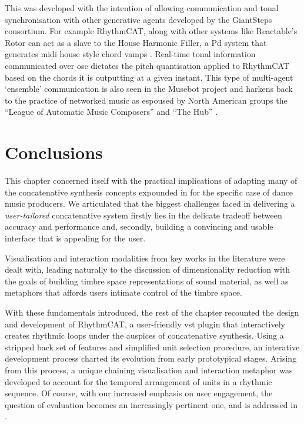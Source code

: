 \normalsize

This was developed with the intention of allowing communication and tonal synchronisation with other generative agents developed by the GiantSteps consortium. For example RhythmCAT, along with other systems like Reactable's Rotor can act as a slave to the House Harmonic Filler, a Pd system that generates \acrshort{midi} house style chord vamps \citep{Faraldo2017a}. Real-time tonal information communicated over \acrshort{osc} dictates the pitch quantisation applied to RhythmCAT based on the chords it is outputting at a given instant. This type of multi-agent `ensemble' communication is also seen in the Musebot project \citep{Bown2013, Bown2015, eigenfeldt2016musebots} and harkens back to the practice of networked music as espoused by North American groups the ``League of Automatic Music Composers'' and ``The Hub'' \citep{bischoff1978music, Gresham-Lancaster1998}.

\section{Conclusions}

This chapter concerned itself with the practical implications of adapting many of the concatenative synthesis concepts expounded in  for the specific case of dance music producers. We articulated that the biggest challenges faced in delivering a \textit{user-tailored} concatenative system firstly lies in the delicate tradeoff between accuracy and performance and, secondly, building a convincing and usable interface that is appealing for the user. 

Visualisation and interaction modalities from key works in the literature were dealt with, leading naturally to the discussion of dimensionality reduction with the goals of building timbre space representations of sound material, as well as metaphors that affords users intimate control of the timbre space.

With these fundamentals introduced, the rest of the chapter recounted the design and development of RhythmCAT, a user-friendly \acrshort{vst} plugin that interactively creates rhythmic loops under the auspices of concatenative synthesis. Using a stripped back set of features and simplified unit selection procedure, an interative development process charted its evolution from early prototypical stages. Arising from this process, a unique chaining visualisation and interaction metaphor was developed to account for the temporal arrangement of units in a rhythmic sequence. Of course, with our increased emphasis on user engagement, the question of evaluation becomes an increasingly pertinent one, and is addressed in .

%
